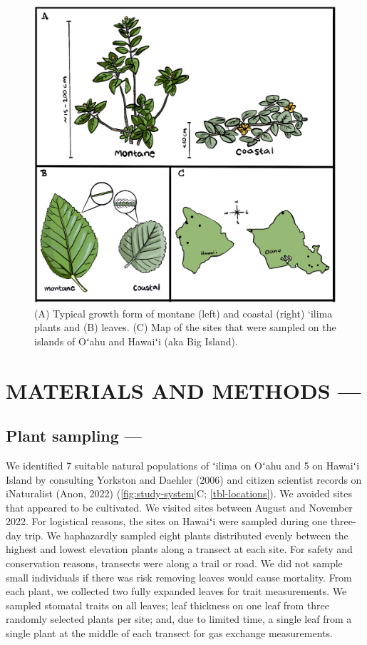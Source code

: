 \documentclass[
  letterpaper,
  DIV=11,
  numbers=noendperiod]{scrartcl}
\begin{document}
\begin{figure}[H]
  \includegraphics{../figures/study-system.pdf}
  \caption{(A) Typical growth form of montane (left) and coastal (right) ‘ilima plants and (B) leaves. (C) Map of the sites that were sampled on the islands of Oʻahu and Hawaiʻi (aka Big Island).}
  \label{fig:study-system}
\end{figure}

\hypertarget{methods}{%
\section{MATERIALS AND METHODS ---}\label{methods}}

\hypertarget{plant-sampling}{%
\subsection{Plant sampling ---}\label{plant-sampling}}

We identified 7 suitable natural populations of ʻilima on Oʻahu and 5 on
Hawaiʻi Island by consulting Yorkston and Daehler (2006) and citizen
scientist records on iNaturalist (Anon, 2022)
(\autoref{fig:study-system}C; \autoref{tbl-locations}). We avoided sites
that appeared to be cultivated. We visited sites between August and
November 2022. For logistical reasons, the sites on Hawaiʻi were sampled
during one three-day trip. We haphazardly sampled eight plants
distributed evenly between the highest and lowest elevation plants along
a transect at each site. For safety and conservation reasons, transects
were along a trail or road. We did not sample small individuals if there
was risk removing leaves would cause mortality. From each plant, we
collected two fully expanded leaves for trait measurements. We sampled
stomatal traits on all leaves; leaf thickness on one leaf from three
randomly selected plants per site; and, due to limited time, a single
leaf from a single plant at the middle of each transect for gas exchange
measurements.
\end{document}

